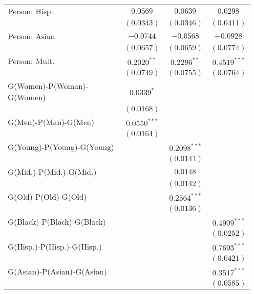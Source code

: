 \begin{center}
\begin{longtable}{l c c c}
Person: Hisp.              & $0.0569$       & $0.0639$        & $0.0298$        \\
                           & $(0.0343)$     & $(0.0346)$      & $(0.0411)$      \\
Person: Asian              & $-0.0744$      & $-0.0568$       & $-0.0928$       \\
                           & $(0.0657)$     & $(0.0659)$      & $(0.0774)$      \\
Person: Mult.              & $0.2020^{**}$  & $0.2296^{**}$   & $0.4519^{***}$  \\
                           & $(0.0749)$     & $(0.0755)$      & $(0.0764)$      \\
G(Women)-P(Woman)-G(Women) & $0.0339^{*}$   &                 &                 \\
                           & $(0.0168)$     &                 &                 \\
G(Men)-P(Man)-G(Men)       & $0.0550^{***}$ &                 &                 \\
                           & $(0.0164)$     &                 &                 \\
G(Young)-P(Young)-G(Young) &                & $0.2098^{***}$  &                 \\
                           &                & $(0.0141)$      &                 \\
G(Mid.)-P(Mid.)-G(Mid.)    &                & $0.0148$        &                 \\
                           &                & $(0.0142)$      &                 \\
G(Old)-P(Old)-G(Old)       &                & $0.2564^{***}$  &                 \\
                           &                & $(0.0136)$      &                 \\
G(Black)-P(Black)-G(Black) &                &                 & $0.4909^{***}$  \\
                           &                &                 & $(0.0252)$      \\
G(Hisp.)-P(Hisp.)-G(Hisp.) &                &                 & $0.7693^{***}$  \\
                           &                &                 & $(0.0421)$      \\
G(Asian)-P(Asian)-G(Asian) &                &                 & $0.3517^{***}$  \\
                           &                &                 & $(0.0585)$      \\

\end{longtable}
\end{center}
